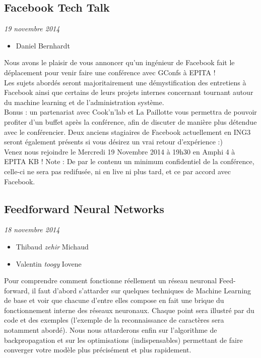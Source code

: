 \documentclass[a4paper]{article}
\begin{document}
\vspace{0.3cm}

\subsection{Facebook Tech Talk}
\emph{19 novembre 2014}
\begin{itemize}
    \item Daniel Bernhardt
\end{itemize}

Nous avons le plaisir de vous annoncer qu'un ingénieur de Facebook fait le
déplacement pour venir faire une conférence avec GConfs à EPITA !\\

Les sujets abordés seront majoritairement une démystification des entretiens à
Facebook ainsi que certains de leurs projets internes concernant tournant
autour du machine learning et de l'administration système.\\

Bonus : un partenariat avec Cook'n'lab et La Paillotte vous permettra de
pouvoir profiter d'un buffet après la conférence, afin de discuter de manière
plus détendue avec le conférencier. Deux anciens stagiaires de Facebook
actuellement en ING3 seront également présents si vous désirez un vrai retour
d'expérience :)\\

Venez nous rejoindre le Mercredi 19 Novembre 2014 à 19h30 en Amphi 4 à EPITA KB
! Note : De par le contenu un minimum confidentiel de la conférence, celle-ci
ne sera pas redifusée, ni en live ni plus tard, et ce par accord avec Facebook.

\vspace{0.3cm}

\subsection{Feedforward Neural Networks}
\emph{18 novembre 2014}
\begin{itemize}
    \item Thibaud \emph{zehir} Michaud
    \item Valentin \emph{toogy} Iovene
\end{itemize}

Pour comprendre comment fonctionne réellement un réseau neuronal Feed-forward,
il faut d'abord s'attarder sur quelques techniques de Machine Learning de base
et voir que chacune d'entre elles compose en fait une brique du fonctionnement
interne des réseaux neuronaux. Chaque point sera illustré par du code et des
exemples (l'exemple de la reconnaissance de caractères sera notamment abordé).
Nous nous attarderons enfin sur l'algorithme de backpropagation et sur les
optimisations (indispensables) permettant de faire converger votre modèle plus
précisément et plus rapidement.
\end{document}
